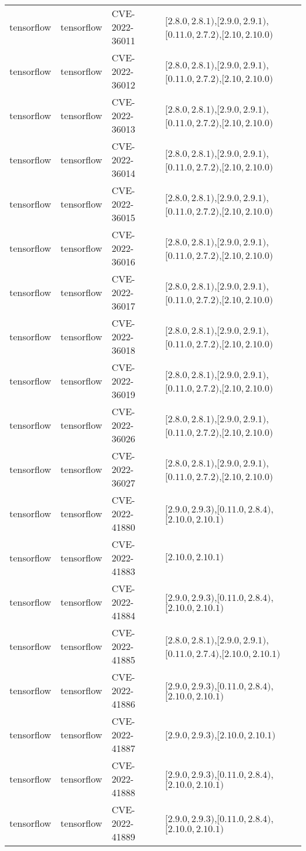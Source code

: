 \begin{tabular}{llll}
tensorflow & tensorflow & CVE-2022-36011 & $[2.8.0,2.8.1)$,$[2.9.0,2.9.1)$,$[0.11.0,2.7.2)$,$[2.10,2.10.0)$ \\
tensorflow & tensorflow & CVE-2022-36012 & $[2.8.0,2.8.1)$,$[2.9.0,2.9.1)$,$[0.11.0,2.7.2)$,$[2.10,2.10.0)$ \\
tensorflow & tensorflow & CVE-2022-36013 & $[2.8.0,2.8.1)$,$[2.9.0,2.9.1)$,$[0.11.0,2.7.2)$,$[2.10,2.10.0)$ \\
tensorflow & tensorflow & CVE-2022-36014 & $[2.8.0,2.8.1)$,$[2.9.0,2.9.1)$,$[0.11.0,2.7.2)$,$[2.10,2.10.0)$ \\
tensorflow & tensorflow & CVE-2022-36015 & $[2.8.0,2.8.1)$,$[2.9.0,2.9.1)$,$[0.11.0,2.7.2)$,$[2.10,2.10.0)$ \\
tensorflow & tensorflow & CVE-2022-36016 & $[2.8.0,2.8.1)$,$[2.9.0,2.9.1)$,$[0.11.0,2.7.2)$,$[2.10,2.10.0)$ \\
tensorflow & tensorflow & CVE-2022-36017 & $[2.8.0,2.8.1)$,$[2.9.0,2.9.1)$,$[0.11.0,2.7.2)$,$[2.10,2.10.0)$ \\
tensorflow & tensorflow & CVE-2022-36018 & $[2.8.0,2.8.1)$,$[2.9.0,2.9.1)$,$[0.11.0,2.7.2)$,$[2.10,2.10.0)$ \\
tensorflow & tensorflow & CVE-2022-36019 & $[2.8.0,2.8.1)$,$[2.9.0,2.9.1)$,$[0.11.0,2.7.2)$,$[2.10,2.10.0)$ \\
tensorflow & tensorflow & CVE-2022-36026 & $[2.8.0,2.8.1)$,$[2.9.0,2.9.1)$,$[0.11.0,2.7.2)$,$[2.10,2.10.0)$ \\
tensorflow & tensorflow & CVE-2022-36027 & $[2.8.0,2.8.1)$,$[2.9.0,2.9.1)$,$[0.11.0,2.7.2)$,$[2.10,2.10.0)$ \\
tensorflow & tensorflow & CVE-2022-41880 & $[2.9.0,2.9.3)$,$[0.11.0,2.8.4)$,$[2.10.0,2.10.1)$ \\
tensorflow & tensorflow & CVE-2022-41883 & $[2.10.0,2.10.1)$ \\
tensorflow & tensorflow & CVE-2022-41884 & $[2.9.0,2.9.3)$,$[0.11.0,2.8.4)$,$[2.10.0,2.10.1)$ \\
tensorflow & tensorflow & CVE-2022-41885 & $[2.8.0,2.8.1)$,$[2.9.0,2.9.1)$,$[0.11.0,2.7.4)$,$[2.10.0,2.10.1)$ \\
tensorflow & tensorflow & CVE-2022-41886 & $[2.9.0,2.9.3)$,$[0.11.0,2.8.4)$,$[2.10.0,2.10.1)$ \\
tensorflow & tensorflow & CVE-2022-41887 & $[2.9.0,2.9.3)$,$[2.10.0,2.10.1)$ \\
tensorflow & tensorflow & CVE-2022-41888 & $[2.9.0,2.9.3)$,$[0.11.0,2.8.4)$,$[2.10.0,2.10.1)$ \\
tensorflow & tensorflow & CVE-2022-41889 & $[2.9.0,2.9.3)$,$[0.11.0,2.8.4)$,$[2.10.0,2.10.1)$ \\

\end{tabular}
